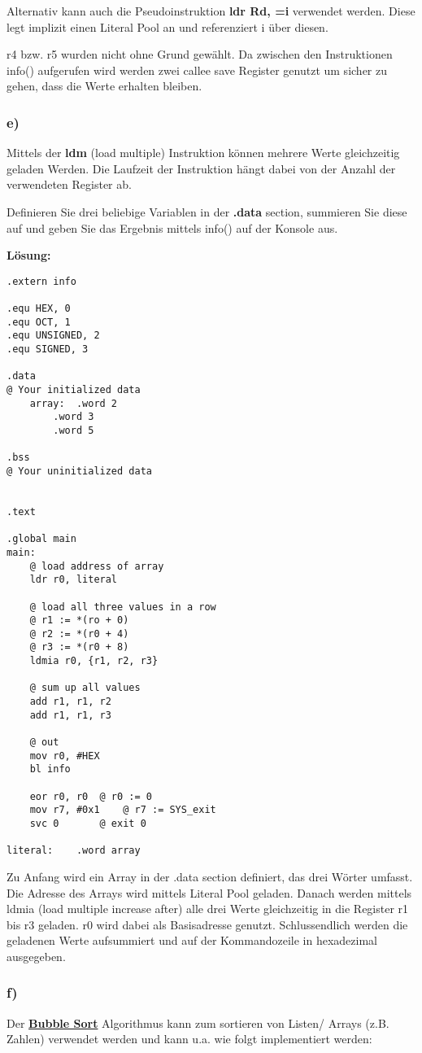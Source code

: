 \documentclass[12pt]{article}
\begin{document}
Alternativ kann auch die Pseudoinstruktion \textbf{ldr Rd, =i} verwendet werden. Diese legt implizit einen Literal Pool an und
referenziert i über diesen.

r4 bzw. r5 wurden nicht ohne Grund gewählt. Da zwischen den Instruktionen info() aufgerufen wird werden zwei callee save Register
genutzt um sicher zu gehen, dass die Werte erhalten bleiben.


\subsubsection{e)}
Mittels der \textbf{ldm} (load multiple) Instruktion können mehrere Werte gleichzeitig geladen Werden. Die Laufzeit der Instruktion hängt
dabei von der Anzahl der verwendeten Register ab.

Definieren Sie drei beliebige Variablen in der \textbf{.data} section, summieren Sie diese auf und geben Sie das Ergebnis mittels info()
auf der Konsole aus.

\textbf{Lösung:}
\begin{lstlisting}
.extern info

.equ HEX, 0
.equ OCT, 1
.equ UNSIGNED, 2
.equ SIGNED, 3

.data
@ Your initialized data
	array:	.word 2
		.word 3
		.word 5

.bss
@ Your uninitialized data


.text

.global main
main:
	@ load address of array
	ldr r0, literal
	
	@ load all three values in a row
	@ r1 := *(ro + 0)
	@ r2 := *(r0 + 4)
	@ r3 := *(r0 + 8)
	ldmia r0, {r1, r2, r3}

	@ sum up all values
	add r1, r1, r2
	add r1, r1, r3
	
	@ out
	mov r0, #HEX
	bl info

	eor r0, r0	@ r0 := 0
	mov r7, #0x1	@ r7 := SYS_exit
	svc 0		@ exit 0

literal:	.word array
\end{lstlisting}
Zu Anfang wird ein Array in der .data section definiert, das drei Wörter umfasst.
Die Adresse des Arrays wird mittels Literal Pool geladen.
Danach werden mittels ldmia (load multiple increase after) alle drei Werte gleichzeitig
in die Register r1 bis r3 geladen. r0 wird dabei als Basisadresse genutzt.
Schlussendlich werden die geladenen Werte aufsummiert und auf der Kommandozeile in 
hexadezimal ausgegeben.


\subsubsection{f)}
Der \href{https://en.wikipedia.org/wiki/Bubble\_sort}{\textbf{Bubble Sort}} 
Algorithmus kann zum sortieren von Listen/ Arrays (z.B. Zahlen) verwendet werden 
und kann u.a. wie folgt implementiert werden:
\end{document}
